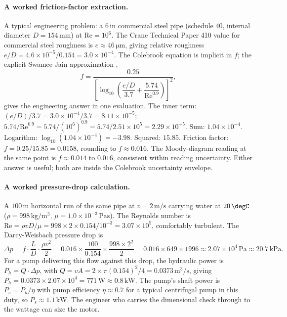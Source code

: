 \paragraph{A worked friction-factor extraction.} A typical
engineering problem: a $6 \,\text{in}$ commercial steel pipe
(schedule 40, internal diameter $D = 154 \,\si{\milli\meter}$) at
$\mathrm{Re} = 10^{6}$. The Crane Technical Paper 410 value for
commercial steel roughness is $e \approx 46 \,\si{\micro\meter}$,
giving relative roughness
$e/D = 4.6 \times 10^{-5}/0.154 = 3.0 \times 10^{-4}$.
The Colebrook equation is implicit in $f$; the explicit
Swamee-Jain approximation \cite{paper:swamee-jain-1976},
\[
f = \frac{0.25}{\left[\log_{10}\!\left(\dfrac{e/D}{3.7}
  + \dfrac{5.74}{\mathrm{Re}^{0.9}}\right)\right]^{2}},
\]
gives the engineering answer in one evaluation. The inner term:
$(e/D)/3.7 = 3.0 \times 10^{-4}/3.7 = 8.11 \times 10^{-5}$;
$5.74/\mathrm{Re}^{0.9} = 5.74/(10^{6})^{0.9}
= 5.74/2.51 \times 10^{5} = 2.29 \times 10^{-5}$.
Sum: $1.04 \times 10^{-4}$. Logarithm: $\log_{10}(1.04 \times 10^{-4})
= -3.98$. Squared: $15.85$. Friction factor:
$f = 0.25/15.85 = 0.0158$, rounding to $f \approx 0.016$. The
Moody-diagram reading at the same point is $f \approx 0.014$ to
$0.016$, consistent within reading uncertainty. Either answer is
useful; both are inside the Colebrook uncertainty envelope.

\paragraph{A worked pressure-drop calculation.} A $100 \,\si
{\meter}$ horizontal run of the same pipe at $v = 2 \,\si{\meter
\per\second}$ carrying water at $20 \,\degC$ ($\rho = 998 \,\si
{\kilogram\per\meter\cubed}$, $\mu = 1.0 \times 10^{-3} \,\si
{\pascal\second}$). The Reynolds number is
$\mathrm{Re} = \rho v D / \mu = 998 \times 2 \times 0.154/10^{-3}
= 3.07 \times 10^{5}$, comfortably turbulent. The Darcy-Weisbach
pressure drop is
\[
\Delta p = f \cdot \frac{L}{D} \cdot \frac{\rho v^{2}}{2}
= 0.016 \times \frac{100}{0.154} \times \frac{998 \times 2^{2}}{2}
= 0.016 \times 649 \times 1996 \approx 2.07 \times 10^{4} \,\si
{\pascal} \approx 20.7 \,\si{\kilo\pascal}.
\]
For a pump delivering this flow against this drop, the hydraulic
power is $P_{h} = Q \cdot \Delta p$, with
$Q = v A = 2 \times \pi (0.154)^{2}/4 = 0.0373 \,\si{\meter
\cubed\per\second}$, giving
$P_{h} = 0.0373 \times 2.07 \times 10^{4} = 771 \,\si{\watt}
\approx 0.8 \,\si{\kilo\watt}$. The pump's shaft power is
$P_{s} = P_{h}/\eta$ with pump efficiency $\eta \approx 0.7$ for a
typical centrifugal pump in this duty, so $P_{s} \approx 1.1 \,\si
{\kilo\watt}$. The engineer who carries the dimensional check
through to the wattage can size the motor.

